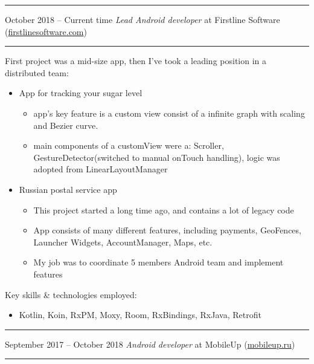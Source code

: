\documentclass[11pt]{article}
\newcommand\CvSmallSkipLength{0.5em}
\newcommand\CvSkip[1]{\vspace{#1}}
\newcommand\CvSmallSkip{\CvSkip{\CvSmallSkipLength}}
\newcommand\CvRule{\begingroup\color{CvRuleColor}\hrule\endgroup}
\newcommand\CvWorkplaceHeader[5]{\begingroup%
  \CvRule%
  \fboxsep0pt%
  \colorbox{CvWorkplaceHeaderColor}{%
    \begin{minipage}{\linewidth-2\fboxsep}%
\CvSmallSkip%
#1 -- #2 \hfill \textit{#3} at #4 (\href{http://#5/}{#5})%
\CvSmallSkip%
    \end{minipage}%
  }%
  \CvRule%
\endgroup%
}
\newenvironment{CvWorkplaceDescription}{%
    \begingroup\setlength\parskip{\CvSmallSkipLength}%
  }{%
    \CvSmallSkip\endgroup%
  }
\begin{document}
\CvWorkplaceHeader{October 2018}{Current time}{Lead Android developer}{Firstline Software}{firstlinesoftware.com}
\begin{CvWorkplaceDescription}
First project	 was a mid-size app, then I've took a leading position in a distributed team:
\begin{itemize}[noitemsep]
 \item App for tracking your sugar level
\begin{itemize}
\item  app's key feature is a custom view consist of a infinite graph with scaling and Bezier curve. 
 \item main components of a customView were a: Scroller, GestureDetector(switched to manual onTouch handling), logic was adopted from LinearLayoutManager
\end{itemize}
\item Russian postal service app
\begin{itemize}
\item  This project started a long time ago, and contains a lot of legacy code
\item  App consists of many different features, including payments, GeoFences, Launcher Widgets, AccountManager, Maps, etc.
 \item My job was to coordinate 5 members Android team and implement features
\end{itemize}
\end{itemize}

Key skills \& technologies employed:
\begin{itemize}[noitemsep]
  \item Kotlin, Koin, RxPM, Moxy, Room, RxBindings, RxJava, Retrofit
\end{itemize}
\end{CvWorkplaceDescription}

\CvWorkplaceHeader{September 2017}{October 2018}{Android developer}{MobileUp}{mobileup.ru}
\end{document}
